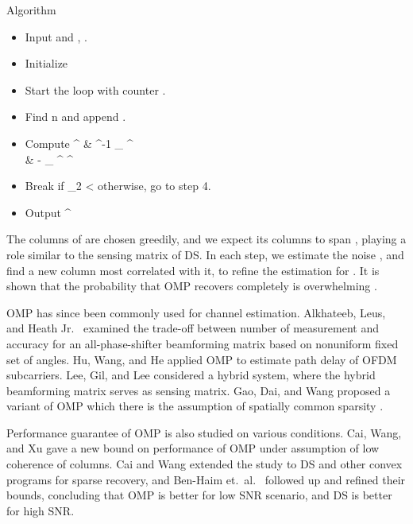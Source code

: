 \Result
{Algorithm}
{
\begin {itemize}
%
\item Input  and , .
%
\item Initialize
%
%
\item Start the loop with counter .
%
\item Find
%
 {
n
\leftarrow {} {}
}
%
and append .
%
\item Compute
%
 {
 ^\ddagger
\leftarrow & ^{-1}  _{} ^\dagger \\
%
\leftarrow & - _{} ^\dagger {} ^\ddagger {} 
}
%
\item Break if
%
 {
 _2
<\eta 
}
%
otherwise, go to step 4.
%
\item Output 
%
 {
\leftarrow {} ^\ddagger {} 
}
\end {itemize}
}
%
The columns of  are chosen greedily, and we expect its columns to span , playing a role similar to the sensing matrix of DS.
In each step, we estimate the noise , and find a new column most correlated with it, to refine the estimation for .
It is shown that the probability that OMP recovers  completely is overwhelming \cite {TrG07a}.

OMP has since been commonly used for channel estimation.
Alkhateeb, Leus, and Heath Jr.\ \cite {ALH15} examined the trade-off between number of measurement and accuracy for an all-phase-shifter beamforming matrix based on nonuniform fixed set of angles.
Hu, Wang, and He \cite {HWH13} applied OMP to estimate path delay of OFDM subcarriers.
Lee, Gil, and Lee \cite {LGL16} considered a hybrid system, where the hybrid beamforming matrix serves as sensing matrix.
Gao, Dai, and Wang proposed a variant of OMP which there is the assumption of spatially common sparsity \cite {GDW15}.

Performance guarantee of OMP is also studied on various conditions.
Cai, Wang, and Xu \cite {CWX10} gave a new bound on performance of OMP under assumption of low coherence of columns.
Cai and Wang \cite {CaW11} extended the study to DS and other convex programs for sparse recovery, and Ben-Haim et.\ al.\ \cite {BEE10} followed up and refined their bounds, concluding that OMP is better for low SNR scenario, and DS is better for high SNR.

